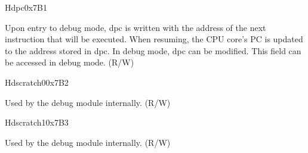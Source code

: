 \begin{register}{H}{dpc}{0x7B1}\label{regdesc:LPDPC}
%
\regnewline%
\begin{regdesc}\begin{reglist}
\label{dpcr}\item [dpc] Upon entry to debug mode, dpc is written with the address of the next instruction that will be executed. When resuming, the CPU core's PC is updated to the address stored in dpc. In debug mode, dpc can be modified. This field can be accessed in debug mode. (R/W)
\end{reglist}\end{regdesc}
\end{register}


\begin{register}{H}{dscratch0}{0x7B2}\label{regdesc:LPDSCRATCH0}
%
\regnewline%
\begin{regdesc}\begin{reglist}
\label{dscratch0}\item [dscratch0] Used by the debug module internally. (R/W)
\end{reglist}\end{regdesc}
\end{register}

\begin{register}{H}{dscratch1}{0x7B3}\label{regdesc:LPDSCRATCH1}
%
\regnewline%
\begin{regdesc}\begin{reglist}
\label{dscratch1}\item [dscratch1] Used by the debug module internally. (R/W)
\end{reglist}\end{regdesc}
\end{register}